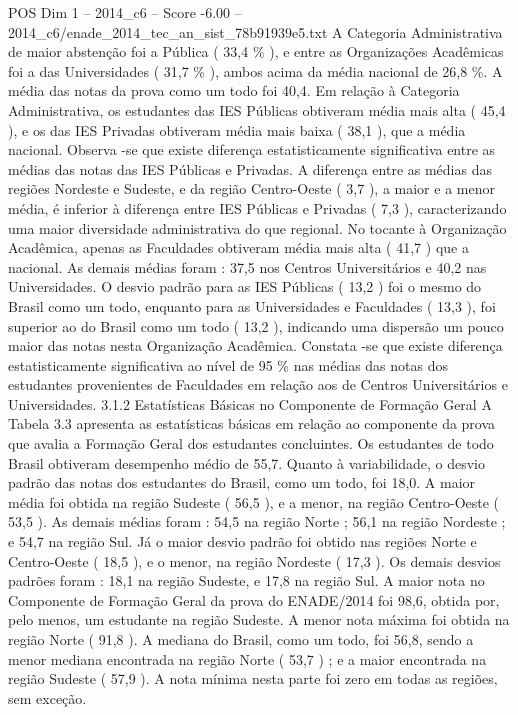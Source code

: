\begin{textsample}{POS Dim 1 – 2014\_c6 – Score -6.00 – 2014\_c6/enade\_2014\_tec\_an\_sist\_78b91939e5.txt}
A Categoria Administrativa de maior abstenção foi a Pública ( 33,4 \% ), e entre as Organizações Acadêmicas foi a das Universidades ( 31,7 \% ), ambos acima da média nacional de 26,8 \%.
A média das notas da prova como um todo foi 40,4.
Em relação à Categoria Administrativa, os estudantes das IES Públicas obtiveram média mais alta ( 45,4 ), e os das IES Privadas obtiveram média mais baixa ( 38,1 ), que a média nacional.
Observa -se que existe diferença estatisticamente significativa entre as médias das notas das IES Públicas e Privadas.
A diferença entre as médias das regiões Nordeste e Sudeste, e da região Centro-Oeste ( 3,7 ), a maior e a menor média, é inferior à diferença entre IES Públicas e Privadas ( 7,3 ), caracterizando uma maior diversidade administrativa do que regional.
No tocante à Organização Acadêmica, apenas as Faculdades obtiveram média mais alta ( 41,7 ) que a nacional.
As demais médias foram : 37,5 nos Centros Universitários e 40,2 nas Universidades.
O desvio padrão para as IES Públicas ( 13,2 ) foi o mesmo do Brasil como um todo, enquanto para as Universidades e Faculdades ( 13,3 ), foi superior ao do Brasil como um todo ( 13,2 ), indicando uma dispersão um pouco maior das notas nesta Organização Acadêmica.
Constata -se que existe diferença estatisticamente significativa ao nível de 95 \% nas médias das notas dos estudantes provenientes de Faculdades em relação aos de Centros Universitários e Universidades. 3.1.2 Estatísticas Básicas no Componente de Formação Geral A Tabela 3.3 apresenta as estatísticas básicas em relação ao componente da prova que avalia a Formação Geral dos estudantes concluintes.
Os estudantes de todo Brasil obtiveram desempenho médio de 55,7.
Quanto à variabilidade, o desvio padrão das notas dos estudantes do Brasil, como um todo, foi 18,0.
A maior média foi obtida na região Sudeste ( 56,5 ), e a menor, na região Centro-Oeste ( 53,5 ).
As demais médias foram : 54,5 na região Norte ; 56,1 na região Nordeste ; e 54,7 na região Sul.
Já o maior desvio padrão foi obtido nas regiões Norte e Centro-Oeste ( 18,5 ), e o menor, na região Nordeste ( 17,3 ).
Os demais desvios padrões foram : 18,1 na região Sudeste, e 17,8 na região Sul.
A maior nota no Componente de Formação Geral da prova do ENADE/2014 foi 98,6, obtida por, pelo menos, um estudante na região Sudeste.
A menor nota máxima foi obtida na região Norte ( 91,8 ).
A mediana do Brasil, como um todo, foi 56,8, sendo a menor mediana encontrada na região Norte ( 53,7 ) ; e a maior encontrada na região Sudeste ( 57,9 ).
A nota mínima nesta parte foi zero em todas as regiões, sem exceção.

\end{textsample}
